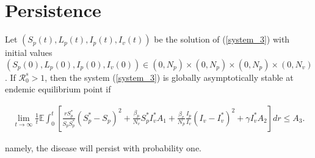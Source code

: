\section{Persistence}

\begin{theorem}\label{theorem_3}
	Let $(S_p(t),L_p(t),I_p(t),I_v(t))$ be the solution of (\ref{system_3}) with initial values $(S_p(0),L_p(0),I_p(0),I_v(0))\in (0,N_p)\times(0,N_p)\times(0,N_p)\times(0,N_v)$. If $\mathcal{R}^s_0>1$, then the system (\ref{system_3}) is globally asymptotically stable at endemic equilibrium point if
	
	\begin{align*}
		\lim\limits_{t\rightarrow \infty}\frac{1}{t}\mathbb{E}\int_{0}^{t}\left[\frac{rS_p^*}{S_pS_p^*}(S_p^*-S_p)^2+\frac{\beta_p}{N_v}S_p^*I_v^*A_1+\frac{\beta_v}{N_p}\frac{I_p}{I_v}(I_v-I_v^*)^2+\gamma I_v^*A_2\right]dr\leq A_3.
	\end{align*}
	
	namely, the disease will persist with probability one.
\end{theorem}
